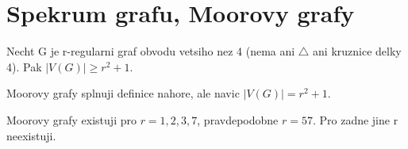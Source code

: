 \section{\texorpdfstring{Spekrum grafu, Moorovy grafy}{Spekrum grafu, Moorovy grafy}}
\vspace{5mm}
\large

\begin{definition}
Necht G je r-regularni graf obvodu vetsiho nez 4 (nema ani $\triangle$ ani kruznice delky 4). Pak $|V(G)| \geq r^2 + 1$.
\end{definition}
\begin{definition}
Moorovy grafy splnuji definice nahore, ale navic $|V(G)| = r^2 + 1$.
\end{definition}

\begin{theorem}
	Moorovy grafy existuji pro $r = 1,2,3,7$, pravdepodobne $r = 57$. Pro zadne jine r neexistuji.
\end{theorem}
